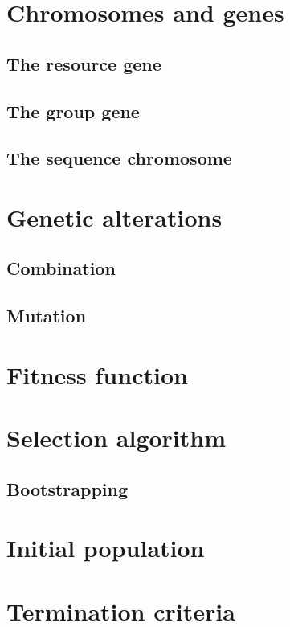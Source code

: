 \section{Chromosomes and genes}
\subsection{The resource gene}
\subsection{The group gene}
\subsection{The sequence chromosome}
\section{Genetic alterations}
\subsection{Combination}
\subsection{Mutation}
\section{Fitness function}
\section{Selection algorithm}
\subsection{Bootstrapping}
\section{Initial population}
\section{Termination criteria}
